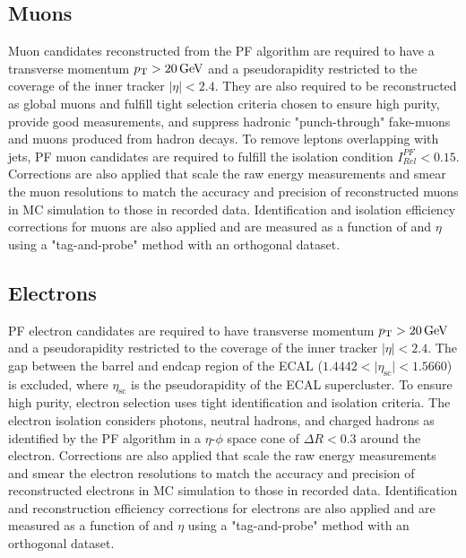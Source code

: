 \subsection{Muons}
Muon candidates reconstructed from the PF algorithm are required to have a transverse momentum $\pT > \SI{20}{\GeV}$ and a pseudorapidity restricted to the coverage of the inner tracker $\vert \eta \vert < 2.4$.
They are also required to be reconstructed as global muons and fulfill tight selection criteria chosen to ensure high purity, provide good \pT measurements, and suppress hadronic "punch-through" fake-muons and muons produced from hadron decays.
To remove leptons overlapping with jets, PF muon candidates are required to fulfill the isolation condition $I^{PF}_{Rel}< 0.15$.
Corrections are also applied that scale the raw energy measurements and smear the muon resolutions to match the accuracy and precision of reconstructed muons in MC simulation to those in recorded data.
Identification and isolation efficiency corrections for muons are also applied and are measured as a function of \pT and $\eta$ using a "tag-and-probe" method with an orthogonal dataset.

\subsection{Electrons}
PF electron candidates are required to have transverse momentum $\pT > \SI{20}{\GeV}$ and a pseudorapidity restricted to the coverage of the inner tracker $\vert \eta \vert < 2.4$.
The gap between the barrel and endcap region of the ECAL ($1.4442 < \vert \eta_\mathrm{sc} \vert < 1.5660$) is excluded, where $\eta_\mathrm{sc}$ is the pseudorapidity of the ECAL supercluster.
To ensure high purity, electron selection uses tight identification and isolation criteria.
The electron isolation considers photons, neutral hadrons, and charged hadrons as identified by the PF algorithm in a $\eta$-$\phi$ space cone of $\Delta R < 0.3$ around the electron.
Corrections are also applied that scale the raw energy measurements and smear the electron resolutions to match the accuracy and precision of reconstructed electrons in MC simulation to those in recorded data.
Identification and reconstruction efficiency corrections for electrons are also applied and are measured as a function of \pT and $\eta$ using a "tag-and-probe" method with an orthogonal dataset.

